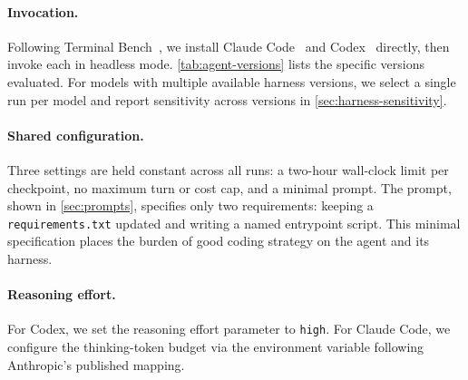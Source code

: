 \paragraph{Invocation.} Following Terminal Bench~\citep{tb2}, we install Claude Code~\citep{claude_code} and Codex~\citep{codex} directly, then invoke each in headless mode. \autoref{tab:agent-versions} lists the specific versions evaluated. For models with multiple available harness versions, we select a single run per model and report sensitivity across versions in \autoref{sec:harness-sensitivity}.

\paragraph{Shared configuration.} Three settings are held constant across all runs: a two-hour wall-clock limit per checkpoint, no maximum turn or cost cap, and a minimal prompt. The prompt, shown in \autoref{sec:prompts}, specifies only two requirements: keeping a \texttt{requirements.txt} updated and writing a named entrypoint script. This minimal specification places the burden of good coding strategy on the agent and its harness.

\paragraph{Reasoning effort.} For Codex, we set the reasoning effort parameter to \texttt{high}. For Claude Code, we configure the thinking-token budget via the environment variable following Anthropic's published mapping.
